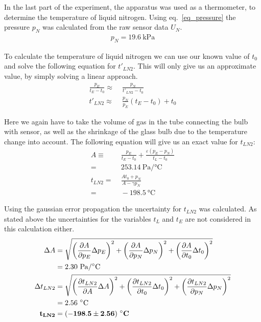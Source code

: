     In the last part of the experiment, the apparatus was used as a thermometer, to determine the 
    temperature of liquid nitrogen.
    Using eq.~\ref{eq_pressure} the pressure $p_N$ was calculated from the raw sensor data $U_N$.
    \begin{align}
        p_N = 19.6~\si{\kilo\pascal}
    \end{align}

    To calculate the temperature of liquid nitrogen we can use our known value of $t_0$ and solve
    the following equation for $t'_{LN2}$. This will only give us an approximate value, by simply solving a linear approach.
    \begin{align}
        \frac{p_E}{t_E - t_0} \approx& \; \frac{p_N}{t'_{LN2} - t_0}\\
        t'_{LN2} \approx& \; \frac{p_N}{p_E}(t_E - t_0) + t_0
    \end{align}

    Here we again have to take the volume of gas in the tube connecting the bulb with sensor,
    as well as the shrinkage of the glass bulb due to the temperature change into account.
    The following equation will give us an exact value for $t_{LN2}$:
    \begin{align}
        A \equiv& \; \frac{p_E}{t_E - t_0} + \frac{\varepsilon(p_E - p_N)}{t_L - t_0}\\
        =& \; 253.14~\si{\pascal/\celsius}\\
        t_{LN2} =& \; \frac{A t_0 + p_N}{A - \gamma p_N}\\
        =& \; -198.5~\si{\celsius} \label{val_tN}
    \end{align}

    Using the gaussian error propagation the uncertainty for $t_{LN2}$ was calculated. As stated above
    the uncertainties for the variables $t_L$ and $t_E$ are not considered in this calculation either.
    \begin{align}
        \Delta A =& \; \sqrt{ \left(\frac{\partial A}{\partial p_E} \Delta p_E \right)^2 +
                            \left(\frac{\partial A}{\partial p_N} \Delta p_N \right)^2 +
                            \left(\frac{\partial A}{\partial t_0} \Delta t_0 \right)^2 }\\
        =& \; 2.30~\si{\pascal/\celsius}\\
        \Delta t_{LN2} =& \; \sqrt{ \left(\frac{\partial t_{LN2}}{\partial A} \Delta A \right)^2 +
                                    \left(\frac{\partial t_{LN2}}{\partial t_0} \Delta t_0 \right)^2 +
                                    \left(\frac{\partial t_{LN2}}{\partial p_N} \Delta p_N \right)^2 }\\
        =& \; 2.56~\si{\celsius}\\
        \bf t_{LN2} =& \; \bf (-198.5 \pm 2.56) ~\si{\bf\celsius} \label{res_tN}
    \end{align}